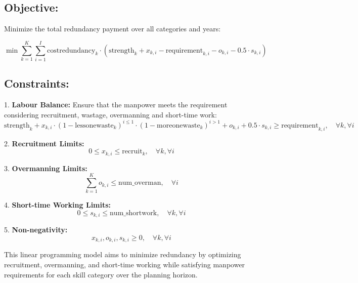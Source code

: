 \documentclass{article}
\begin{document}
\subsection*{Objective:}

Minimize the total redundancy payment over all categories and years:

\[
\min \sum_{k=1}^{K} \sum_{i=1}^{I} \text{costredundancy}_k \cdot \left( \text{strength}_k + x_{k,i} - \text{requirement}_{k,i} - o_{k,i} - 0.5 \cdot s_{k,i} \right)
\]

\subsection*{Constraints:}

1. \textbf{Labour Balance:}
   Ensure that the manpower meets the requirement considering recruitment, wastage, overmanning and short-time work:
   \[
   \text{strength}_k + x_{k,i} \cdot (1 - \text{lessonewaste}_k)^{i \leq 1} \cdot (1 - \text{moreonewaste}_k)^{i > 1} + o_{k,i} + 0.5 \cdot s_{k,i} \geq \text{requirement}_{k,i}, \quad \forall k, \forall i
   \]

2. \textbf{Recruitment Limits:}
   \[
   0 \leq x_{k,i} \leq \text{recruit}_k, \quad \forall k, \forall i
   \]

3. \textbf{Overmanning Limits:}
   \[
   \sum_{k=1}^{K} o_{k,i} \leq \text{num\_overman}, \quad \forall i
   \]

4. \textbf{Short-time Working Limits:}
   \[
   0 \leq s_{k,i} \leq \text{num\_shortwork}, \quad \forall k, \forall i
   \]

5. \textbf{Non-negativity:}
   \[
   x_{k,i}, o_{k,i}, s_{k,i} \geq 0, \quad \forall k, \forall i
   \]

\noindent
This linear programming model aims to minimize redundancy by optimizing recruitment, overmanning, and short-time working while satisfying manpower requirements for each skill category over the planning horizon.
\end{document}
